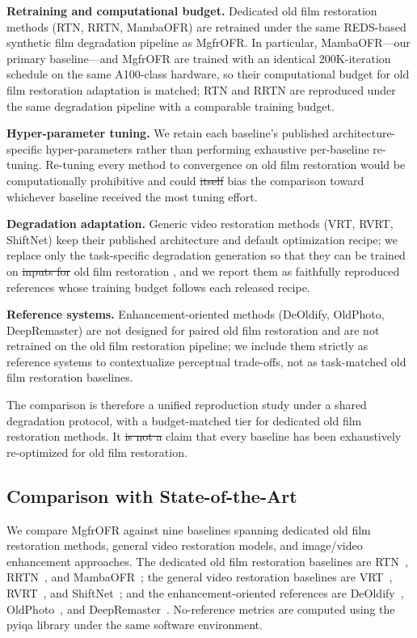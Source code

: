 \documentclass[symmetry,article,submit,pdftex,moreauthors]{Definitions/mdpi}
\providecommand{\DIFadd}[1]{{\protect\color{blue}\uwave{#1}}} %
\providecommand{\DIFdel}[1]{{\protect\color{red}\sout{#1}}}                      %
\providecommand{\DIFaddbegin}{} %
\providecommand{\DIFaddend}{} %
\providecommand{\DIFdelbegin}{} %
\providecommand{\DIFdelend}{} %
\begin{document}
\textbf{Retraining and computational budget.} Dedicated old film restoration methods (RTN, RRTN, MambaOFR) are retrained under the same REDS-based synthetic film degradation pipeline as MgfrOFR. In particular, MambaOFR---our primary baseline---and MgfrOFR are trained with an identical 200K-iteration schedule on the same A100-class hardware, so their computational budget for old film restoration adaptation is matched; RTN and RRTN are reproduced under the same degradation pipeline with a comparable training budget.

\textbf{Hyper-parameter tuning.} We retain each baseline's published architecture-specific hyper-parameters rather than performing exhaustive per-baseline re-tuning. Re-tuning every method to convergence on old film restoration would be computationally prohibitive and could \DIFdelbegin \DIFdel{itself }\DIFdelend bias the comparison toward whichever baseline received the most tuning effort.

\textbf{Degradation adaptation.} Generic video restoration methods (VRT, RVRT, ShiftNet) keep their published architecture and default optimization recipe; we replace only the task-specific degradation generation so that they can be trained on \DIFdelbegin \DIFdel{inputs for }\DIFdelend old film restoration \DIFaddbegin \DIFadd{inputs}\DIFaddend , and we report them as faithfully reproduced references whose training budget follows each released recipe.

\textbf{Reference systems.} Enhancement-oriented methods (DeOldify, OldPhoto, DeepRemaster) are not designed for paired old film restoration and are not retrained on the old film restoration pipeline; we include them strictly as reference systems to contextualize perceptual trade-offs, not as task-matched old film restoration baselines.

The comparison is therefore a unified reproduction study under a shared degradation protocol, with a budget-matched tier for dedicated old film restoration methods. It \DIFdelbegin \DIFdel{is not a }\DIFdelend \DIFaddbegin \DIFadd{does not }\DIFaddend claim that every baseline has been exhaustively re-optimized for old film restoration.

\subsection{Comparison with State-of-the-Art}
\label{subsec:comparison_sota}

We compare MgfrOFR against nine baselines spanning dedicated old film restoration methods, general video restoration models, and image/video enhancement approaches. The dedicated old film restoration baselines are RTN~\cite{wan2022rtn}, RRTN~\cite{lin2024rrtn}, and MambaOFR~\cite{mao2025mambaofr}; the general video restoration baselines are VRT~\cite{liang2024vrt}, RVRT~\cite{liang2022rvrt}, and ShiftNet~\cite{li2023shiftnet}; and the enhancement-oriented references are DeOldify~\cite{jantic2019deoldify}, OldPhoto~\cite{wan2023oldphotopami}, and DeepRemaster~\cite{iizuka2019deepremaster}. No-reference metrics are computed using the pyiqa library under the same software environment.
\end{document}
